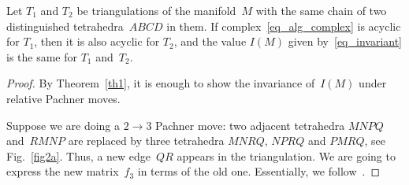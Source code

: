 \documentclass[pdftex]{sigma}
\begin{document}
\begin{theorem}
Let $T_1$ and $T_2$ be triangulations of the manifold~$M$ with the same chain of two distinguished tetrahedra~$ABCD$ in them. If complex~\eqref{eq_alg_complex} is acyclic for $T_1$, then it is also acyclic for $T_2$, and the value $I(M)$ given by~\eqref{eq_invariant} is the same for $T_1$ and~$T_2$.
\label{th3}
\end{theorem}

\begin{proof}
By Theorem~\ref{th1}, it is enough to show the invariance of~$I(M)$ under relative Pachner moves.

Suppose we are doing a $2\to 3$ Pachner move: two adjacent tetrahedra $MNPQ$ and~$RMNP$ are replaced by three tetrahedra $MNRQ$, $NPRQ$
and $PMRQ$, see Fig.~\ref{fig2a}. Thus, a new edge~$QR$ appears in the triangulation. We are going to express the new matrix~$f_3$ in terms of the old one. Essentially, we follow~\cite[Section~4]{JNMP1}.


\end{proof}
\end{document}
